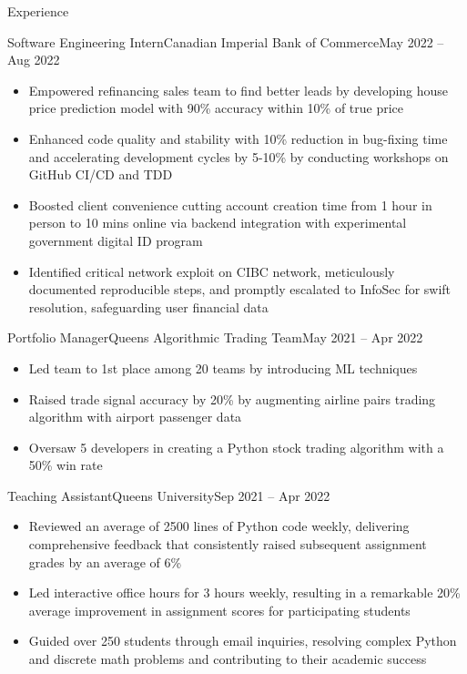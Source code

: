 \documentclass[]{mcdowellcv}
\begin{document}
\begin{cvsection}{Experience}
\begin{cvsubsection}{Software Engineering Intern}{Canadian Imperial Bank of Commerce}{May 2022 -- Aug 2022}
		\begin{itemize}%
			\item Empowered refinancing sales team to find better leads by developing house price prediction model with 90\% accuracy within 10\% of true price
			\item Enhanced code quality and stability with 10\% reduction in bug-fixing time and accelerating development cycles by 5-10\% by conducting workshops on GitHub CI/CD and TDD
			\item Boosted client convenience cutting account creation time from 1 hour in person to 10 mins online via backend integration with experimental government digital ID program
			\item Identified critical network exploit on CIBC network, meticulously documented reproducible steps, and promptly escalated to InfoSec for swift resolution, safeguarding user financial data
		\end{itemize}
	\end{cvsubsection}
	\begin{cvsubsection}{Portfolio Manager}{Queen\textquotesingle{}s Algorithmic Trading Team}{May 2021 -- Apr 2022}
		            
		\begin{itemize}%
			\item Led team to 1st place among 20 teams by introducing ML techniques
			\item Raised trade signal accuracy by 20\% by augmenting airline pairs trading algorithm with airport passenger data
			\item Oversaw 5 developers in creating a Python stock trading algorithm with a 50\% win rate
		\end{itemize}
	\end{cvsubsection}
	\begin{cvsubsection}{Teaching Assistant}{Queen\textquotesingle{}s University}{Sep 2021 -- Apr 2022}
		            
		\begin{itemize}%
			\item Reviewed an average of 2500 lines of Python code weekly, delivering comprehensive feedback that consistently raised subsequent assignment grades by an average of 6\%
			\item Led interactive office hours for 3 hours weekly, resulting in a remarkable 20\% average improvement in assignment scores for participating students
			\item Guided over 250 students through email inquiries, resolving complex Python and discrete math problems and contributing to their academic success
		\end{itemize}
	\end{cvsubsection}
\end{cvsection}
\end{document}
